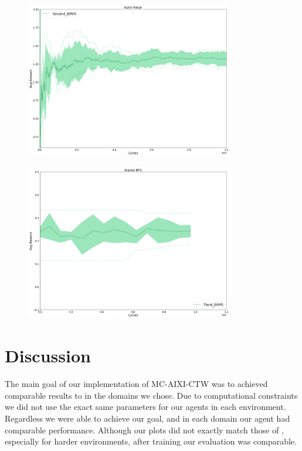 \documentclass{article}
\theoremstyle{definition}
\newtheorem{primary statistics}[definition]{Primary Statistics}
\newtheorem{auxiliary statistics}[definition]{Auxiliary Statistics}
\begin{document}
\begin{figure}[h]
 \centering
    \includegraphics[width=9.1cm]{Second_KPKR}
\end{figure}

\begin{figure}[h]
 \centering
    \includegraphics[width=9.1cm]{Third_BRPS}
\end{figure}


\newpage

\section{Discussion}


The main goal of our implementation of MC-AIXI-CTW was to achieved comparable results to \citep{veness2011monte} in the domains we chose. Due to computational constraints we did not use the exact same parameters for our agents in each environment. Regardless we were able to achieve our goal, and in each domain our agent had comparable performance. Although our plots did not exactly match those of \citep{veness2011monte}, especially for harder environments, after training our evaluation was comparable. \\
\end{document}
